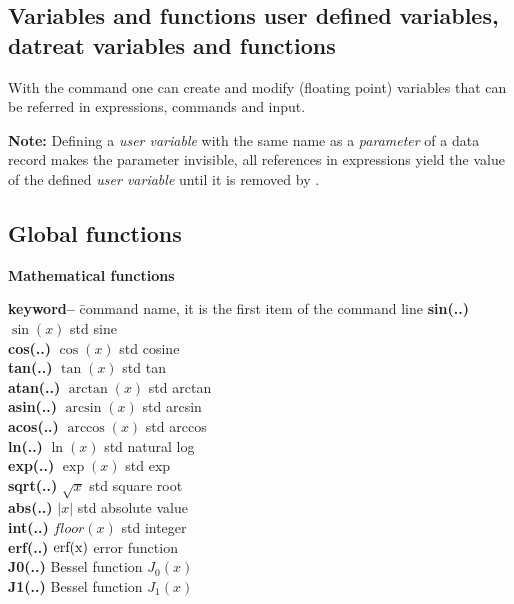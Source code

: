 \documentclass[11pt,fleqn]{book} %
\newcommand{\linespace}{\vspace{4ex}}
\newcommand{\cmdl}[2]{{\color{red}{\bf \underline{#1} #2}}}
\newcommand{\desc}[1]{\hskip 0.5cm {\color{descgray} #1}}
\begin{document}
\subsection{Variables and functions \desc{user defined variables, datreat variables and functions}}
With the \cmdl{set}{} command one can create and modify (floating point) variables that can be
referred in expressions, commands and input.

{\bf Note:} Defining a \emph{user variable} with the same name as a \emph{parameter} of a data record
makes the parameter invisible, all references in expressions yield the value of the defined \emph{user variable}
until it is removed by \cmdl{clr}{varname}.

\subsection{Global functions}

\linespace
\textbf{Mathematical functions}
\linespace
\begin{tabbing}
\textbf{keyword--}  \= command name, it is the first item of the command line                    \kill
\textbf{sin(..)  } \>  $\sin(x)  $  std sine            \\         
\textbf{cos(..)  } \>  $\cos(x)  $  std cosine          \\
\textbf{tan(..)  } \>  $\tan(x)  $  std tan             \\
\textbf{atan(..) } \>  $\arctan(x) $  std arctan          \\
\textbf{asin(..) } \>  $\arcsin(x) $  std arcsin          \\
\textbf{acos(..) } \>  $\arccos(x) $  std arccos          \\
\textbf{ln(..)   } \>  $\ln(x)   $  std natural log     \\
\textbf{exp(..)  } \>  $\exp(x)  $  std exp             \\
\textbf{sqrt(..) } \>  $\sqrt{x} $  std square root     \\
\textbf{abs(..)  } \>  $|x|  $  std absolute value  \\
\textbf{int(..)  } \>  $floor(x)  $  std integer         \\     
\textbf{erf(..)  } \>  $\rm erf(x)  $  error function       \\     
\textbf{J0(..)   } \>   Bessel function ${J_0(x)}$       \\     
\textbf{J1(..)   } \>   Bessel function ${J_1(x)}$           
\end{tabbing}
\end{document}
